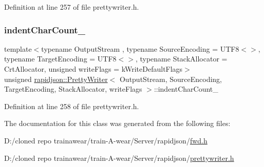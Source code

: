 Definition at line 257 of file prettywriter.\+h.

\mbox{\label{classrapidjson_1_1_pretty_writer_a8b4afa26067dcc84e3940bdde08e59f1}} 
\subsubsection{\texorpdfstring{indentCharCount\_}{indentCharCount\_}}
{\footnotesize\ttfamily template$<$typename Output\+Stream , typename Source\+Encoding  = U\+T\+F8$<$$>$, typename Target\+Encoding  = U\+T\+F8$<$$>$, typename Stack\+Allocator  = Crt\+Allocator, unsigned write\+Flags = k\+Write\+Default\+Flags$>$ \\
unsigned \mbox{\hyperlink{classrapidjson_1_1_pretty_writer}{rapidjson\+::\+Pretty\+Writer}}$<$ Output\+Stream, Source\+Encoding, Target\+Encoding, Stack\+Allocator, write\+Flags $>$\+::indent\+Char\+Count\+\_\+\hspace{0.3cm}{\ttfamily [protected]}}



Definition at line 258 of file prettywriter.\+h.



The documentation for this class was generated from the following files\+:\begin{DoxyCompactItemize}
\item 
D\+:/cloned repo trainawear/train-\/\+A-\/wear/\+Server/rapidjson/\mbox{\hyperlink{fwd_8h}{fwd.\+h}}\item 
D\+:/cloned repo trainawear/train-\/\+A-\/wear/\+Server/rapidjson/\mbox{\hyperlink{prettywriter_8h}{prettywriter.\+h}}\end{DoxyCompactItemize}
